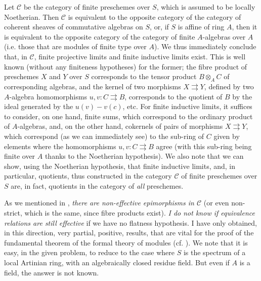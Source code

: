 \documentclass{article}
\renewcommand{\cal}[1]{{\mathcal{#1}}}
\newcommand{\oldpage}[1]{\marginpar{\footnotesize$\Big\vert$ \textit{p.~#1}}}
\begin{document}
Let $\cal{C}$ be the category of finite preschemes over $S$, which is assumed to be locally Noetherian.
Then $\cal{C}$ is equivalent to the opposite category of the category of coherent sheaves of commutative algebras on $S$, or, if $S$ is affine of ring $A$, then it is equivalent to the opposite category of the category of finite $A$-algebras over $A$ (i.e. those that are modules of finite type over $A$).
We thus immediately conclude that, in $\cal{C}$, finite projective limits and finite inductive limits exist.
This is well known (without any finiteness hypotheses) for the former;
the fibre product of preschemes $X$ and $Y$ over $S$ corresponds to the tensor product $B\otimes_A C$ of corresponding algebras, and the kernel of two morphisms $X\rightrightarrows Y$, defined by two $A$-algebra homomorphisms $u,v\colon C\rightrightarrows B$, corresponds to the quotient of $B$ by the ideal generated by the $u(v)-v(c)$, etc.
For finite inductive limits, it suffices to consider, on one hand, finite sums, which correspond to the ordinary product of $A$-algebras, and, on the other hand, cokernels of pairs of morphisms $X\rightrightarrows Y$, which correspond (as we can immediately see) to the sub-ring of $C$ given by elements where the homomorphisms $u,v\colon C\rightrightarrows B$ agree (with this sub-ring being finite over $A$ thanks to the Noetherian hypothesis).
We also note that we can show, using the Noetherian hypothesis, that finite inductive limits, and, in particular, quotients, thus constructed in the category $\cal{C}$ of finite preschemes over $S$ are, in fact, quotients in the category of \emph{all} preschemes.

\oldpage{212-05}
As we mentioned in \cite{1}, \emph{there are non-effective epimorphisms in $\cal{C}$} (or even non-strict, which is the same, since fibre products exist).
\emph{I do not know if equivalence relations are still effective} if we have no flatness hypothesis.
I have only obtained, in this direction, very partial, positive, results, that are vital for the proof of the fundamental theorem of the formal theory of modules (cf. \cite[B, Theorem~1]{2}).
We note that it is easy, in the given problem, to reduce to the case where $S$ is the spectrum of a local Artinian ring, with an algebraically closed residue field.
But even if $A$ is a field, the answer is not known.
\end{document}
